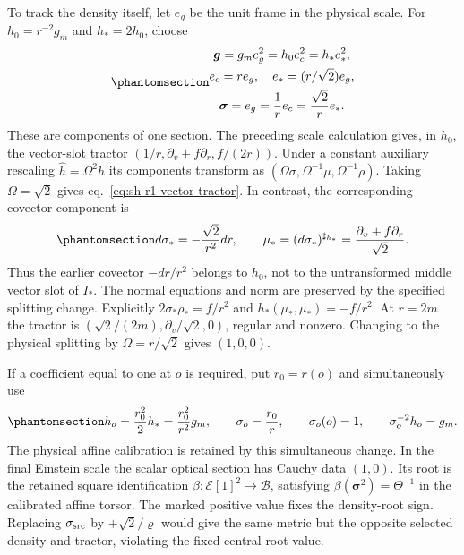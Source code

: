 \documentclass[
  english,
  11pt,
  reqno]{amsart}
\begin{document}
To track the density itself, let \(e_g\) be the unit frame in the
physical scale. For \(h_0=r^{-2}g_m\) and \(h_*=2h_0\), choose
\begin{equation}\protect\phantomsection\label{eq:sh-r1-density-frame}{\begin{gathered}
\boldsymbol g=g_me_g^2=h_0e_c^2=h_*e_*^2, \\
e_c=re_g,\quad e_*=(r/\sqrt2)e_g, \\
\boldsymbol\sigma=e_g=\frac1r e_c=\frac{\sqrt2}{r}e_*.
\end{gathered}}\end{equation} These are components of one section. The preceding scale
calculation gives, in \(h_0\), the vector-slot tractor
\((1/r,\partial_v+f\partial_r,f/(2r))\). Under a constant auxiliary
rescaling \(\widehat h=\Omega^2h\) its components transform as
\((\Omega\sigma,\Omega^{-1}\mu,\Omega^{-1}\rho)\). Taking
\(\Omega=\sqrt2\) gives eq.~\ref{eq:sh-r1-vector-tractor}. In contrast,
the corresponding covector component is
\begin{equation}\protect\phantomsection\label{eq:sh-r1-vector-covector-dictionary}{
 d\sigma_*=-\frac{\sqrt2}{r^2}dr,
 \qquad \mu_*=(d\sigma_*)^{\sharp_{h_*}}
               =\frac{\partial_v+f\partial_r}{\sqrt2}.
}\end{equation} Thus the earlier covector \(-dr/r^2\) belongs to
\(h_0\), not to the untransformed middle vector slot of \(I_*\). The
normal equations and norm are preserved by the specified splitting
change. Explicitly \(2\sigma_*\rho_*=f/r^2\) and
\(h_*(\mu_*,\mu_*)=-f/r^2\). At \(r=2m\) the tractor is
\((\sqrt2/(2m),\partial_v/\sqrt2,0)\), regular and nonzero. Changing to
the physical splitting by \(\Omega=r/\sqrt2\) gives \((1,0,0)\).

If a coefficient equal to one at \(o\) is required, put \(r_0=r(o)\) and
simultaneously use
\begin{equation}\protect\phantomsection\label{eq:sh-r1-point-normalization}{
 h_o=\frac{r_0^2}{2}h_* =\frac{r_0^2}{r^2}g_m,
 \qquad \sigma_o=\frac{r_0}{r},\qquad
 \sigma_o(o)=1,\qquad \sigma_o^{-2}h_o=g_m.
}\end{equation} The physical affine calibration is retained by this
simultaneous change. In the final Einstein scale the scalar optical
section has Cauchy data \((1,0)\). Its root is the retained square
identification \(\beta:\mathcal E[1]^2\to\mathcal B\), satisfying
\(\beta(\boldsymbol\sigma^2)=\Theta^{-1}\) in the calibrated affine
torsor. The marked positive value fixes the density-root sign. Replacing
\(\sigma_{\rm src}\) by \(+\sqrt2/\varrho\) would give the same metric
but the opposite selected density and tractor, violating the fixed
central root value.
\end{document}
